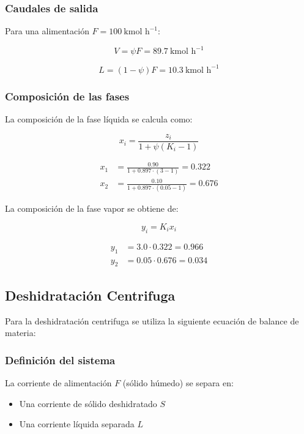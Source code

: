 \documentclass{report}
\begin{document}
\newpage
\subsubsection{Caudales de salida}

Para una alimentación $F = 100\ \text{kmol h}^{-1}$:

\begin{equation}
V = \psi F = 89.7\ \text{kmol h}^{-1}
\end{equation}

\begin{equation}
L = (1 - \psi)F = 10.3\ \text{kmol h}^{-1}
\end{equation}

\subsubsection{Composición de las fases}

La composición de la fase líquida se calcula como:

\begin{equation}
x_i = \frac{z_i}{1 + \psi (K_i - 1)}
\end{equation}

\begin{align}
x_1 &= \frac{0.90}{1 + 0.897\cdot(3 - 1)} = 0.322 \\
x_2 &= \frac{0.10}{1 + 0.897\cdot(0.05 - 1)} = 0.676
\end{align}

La composición de la fase vapor se obtiene de:

\begin{equation}
y_i = K_i x_i
\end{equation}

\begin{align}
y_1 &= 3.0 \cdot 0.322 = 0.966 \\
y_2 &= 0.05 \cdot 0.676 = 0.034
\end{align}
\subsection{Deshidratación Centrifuga}
Para la deshidratación centrifuga se utiliza la siguiente ecuación de balance de materia:
\subsubsection{Definición del sistema}

La corriente de alimentación $F$ (sólido húmedo) se separa en:
\begin{itemize}
    \item Una corriente de sólido deshidratado $S$
    \item Una corriente líquida separada $L$
\end{itemize}
\end{document}
